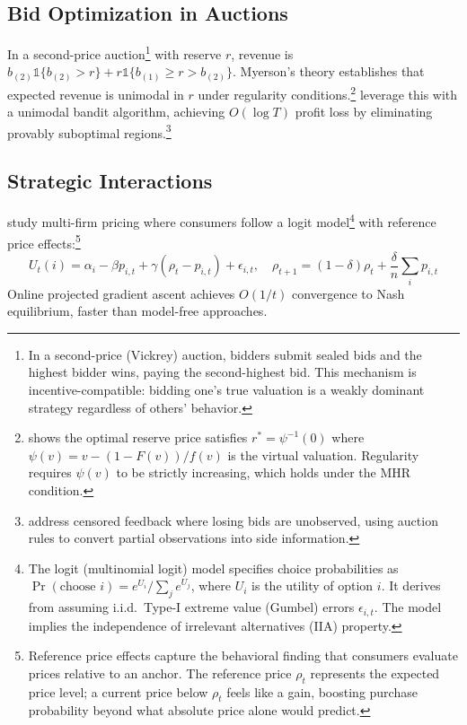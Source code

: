 \subsection{Bid Optimization in Auctions}

In a second-price auction\footnote{In a second-price (Vickrey) auction, bidders submit sealed bids and the highest bidder wins, paying the second-highest bid. This mechanism is incentive-compatible: bidding one's true valuation is a weakly dominant strategy regardless of others' behavior.} with reserve $r$, revenue is $b_{(2)}\mathbb{1}\{b_{(2)} > r\} + r\mathbb{1}\{b_{(1)} \geq r > b_{(2)}\}$. Myerson's theory establishes that expected revenue is unimodal in $r$ under regularity conditions.\footnote{\citet{myerson1981} shows the optimal reserve price satisfies $r^* = \psi^{-1}(0)$ where $\psi(v) = v - (1-F(v))/f(v)$ is the virtual valuation. Regularity requires $\psi(v)$ to be strictly increasing, which holds under the MHR condition.} \citet{CesaBianchi2015} leverage this with a unimodal bandit algorithm, achieving $O(\log T)$ profit loss by eliminating provably suboptimal regions.\footnote{\citet{Akcay2022} address censored feedback where losing bids are unobserved, using auction rules to convert partial observations into side information.}

\subsection{Strategic Interactions}

\citet{Guo2023} study multi-firm pricing where consumers follow a logit model\footnote{The logit (multinomial logit) model specifies choice probabilities as $\Pr(\text{choose } i) = e^{U_i}/\sum_j e^{U_j}$, where $U_i$ is the utility of option $i$. It derives from assuming i.i.d.\ Type-I extreme value (Gumbel) errors $\epsilon_{i,t}$. The model implies the independence of irrelevant alternatives (IIA) property.} with reference price effects:\footnote{Reference price effects capture the behavioral finding that consumers evaluate prices relative to an anchor. The reference price $\rho_t$ represents the expected price level; a current price below $\rho_t$ feels like a gain, boosting purchase probability beyond what absolute price alone would predict.}
\begin{equation}
U_t(i) = \alpha_i - \beta p_{i,t} + \gamma(\rho_t - p_{i,t}) + \epsilon_{i,t}, \quad \rho_{t+1} = (1-\delta)\rho_t + \frac{\delta}{n}\sum_i p_{i,t}
\end{equation}
Online projected gradient ascent achieves $O(1/t)$ convergence to Nash equilibrium, faster than model-free approaches.

